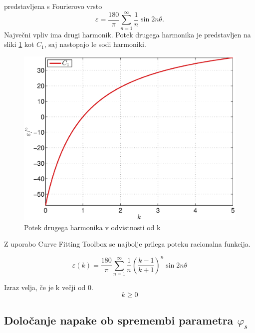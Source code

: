\documentclass[a4paper]{article}
\begin{document}
predstavljena s Fourierovo vrsto
\begin{equation}
\label{equ:lim_amp_vrsta}
\varepsilon = \frac{180}{\pi}\sum_{n=1}^{\infty}\frac{1}{n} \sin 2 n \theta.
\end{equation}
Največni vpliv ima drugi harmonik. Potek drugega harmonika je predstavljen na sliki \ref{fig:amp} kot $C_1$, saj nastopajo le sodi harmoniki.
\begin{figure}[!htb]
	\begin{center}
		\includegraphics[width=\linewidth]{./Slike/amp.eps}
		\caption{Potek drugega harmonika v odvistnosti od k} \label{fig:amp}
	\end{center}
\end{figure}
Z uporabo Curve Fitting Toolbox se najbolje prilega poteku  racionalna funkcija.

\begin{equation}
\label{equ:amp_err}
\varepsilon(k) =\frac{180}{\pi}\sum_{n=1}^{\infty}\frac{1}{n}(\frac{k-1}{k+1})^n \sin 2 n \theta
\end{equation}

Izraz velja, če je k večji od 0.$$k \geq 0$$

\subsection{Določanje napake ob spremembi parametra $\varphi_{s}$}
\end{document}
